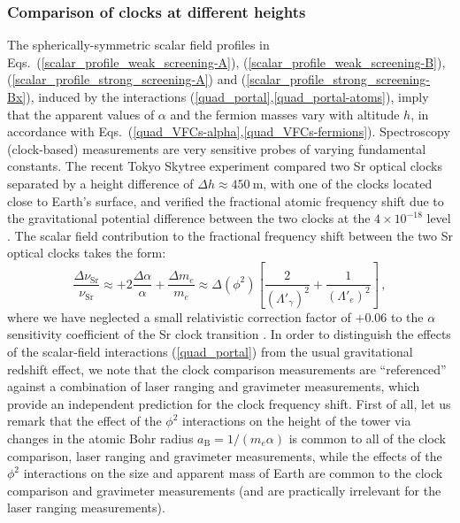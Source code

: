 \documentclass[aps,prd,onecolumn,nofootinbib]{revtex4-2} %
\begin{document}
\subsubsection{Comparison of clocks at different heights}
\label{Sec:Main_Clocks}
The spherically-symmetric scalar field profiles in Eqs.~(\ref{scalar_profile_weak_screening-A}), (\ref{scalar_profile_weak_screening-B}), (\ref{scalar_profile_strong_screening-A}) and (\ref{scalar_profile_strong_screening-Bx}), induced by the interactions (\ref{quad_portal},\ref{quad_portal-atoms}), imply that the apparent values of $\alpha$ and the fermion masses vary with altitude $h$, in accordance with Eqs.~(\ref{quad_VFCs-alpha},\ref{quad_VFCs-fermions}). 
Spectroscopy (clock-based) measurements are very sensitive probes of varying fundamental constants. 
The recent Tokyo Skytree experiment compared two Sr optical clocks separated by a height difference of $\Delta h \approx 450~\textrm{m}$, with one of the clocks located close to Earth's surface, and verified the fractional atomic frequency shift due to the gravitational potential difference between the two clocks at the $4 \times 10^{-18}$ level \cite{TokyoSkytree_2020}. 
The scalar field contribution to the fractional frequency shift between the two Sr optical clocks takes the form: 
\begin{equation}
\label{Sr_sensitivity_coefficients}
\frac{\Delta \nu_\textrm{Sr}}{\nu_\textrm{Sr}} \approx +2 \frac{\Delta \alpha}{\alpha} + \frac{\Delta m_e}{m_e} \approx \Delta(\phi^2) \left[ \frac{2}{\left( \Lambda'_\gamma \right)^2} + \frac{1}{\left( \Lambda'_e \right)^2} \right]  \, , 
\end{equation}
where we have neglected a small relativistic correction factor of $+0.06$ to the $\alpha$ sensitivity coefficient of the Sr clock transition \cite{Sr_sens_coef_2004}. 
In order to distinguish the effects of the scalar-field interactions (\ref{quad_portal}) from the usual gravitational redshift effect, we note that the clock comparison measurements are ``referenced'' against a combination of laser ranging and gravimeter measurements, which provide an independent prediction for the clock frequency shift. 
First of all, let us remark that the effect of the $\phi^2$ interactions on the height of the tower via changes in the atomic Bohr radius $a_\textrm{B} = 1/(m_e \alpha)$ is common to all of the clock comparison, laser ranging and gravimeter measurements, while the effects of the $\phi^2$ interactions on the size and apparent mass of Earth are common to the clock comparison and gravimeter measurements (and are practically irrelevant for the laser ranging measurements). 
\end{document}

